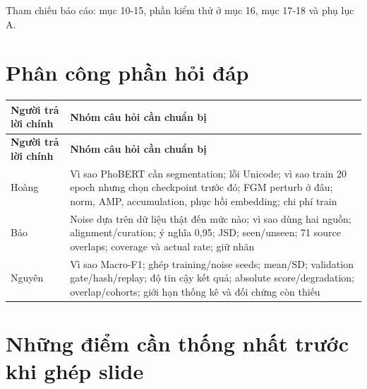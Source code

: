 \documentclass[11pt,a4paper]{article}
\newlength{\reporttablewidth}
\begin{document}
Tham chiếu báo cáo: mục 10-15, phần kiểm thử ở mục 16, mục 17-18 và phụ lục A.


\FloatBarrier\section{Phân công phần hỏi đáp}

\begingroup
\small
\setlength{\tabcolsep}{4pt}
\setlength{\reporttablewidth}{\dimexpr\linewidth-2\tabcolsep\relax}
\renewcommand{\arraystretch}{1.15}
\begin{longtable}{@{}>{\raggedright\arraybackslash}p{0.31000\reporttablewidth}>{\raggedright\arraybackslash}p{0.69000\reporttablewidth}@{}}
\toprule
\textbf{Người trả lời chính} & \textbf{Nhóm câu hỏi cần chuẩn bị} \\
\midrule
\endfirsthead
\toprule
\textbf{Người trả lời chính} & \textbf{Nhóm câu hỏi cần chuẩn bị} \\
\midrule
\endhead
\bottomrule
\endlastfoot
Hoàng & Vì sao PhoBERT cần segmentation; lỗi Unicode; vì sao train 20 epoch nhưng chọn checkpoint trước đó; FGM perturb ở đâu; norm, AMP, accumulation, phục hồi embedding; chi phí train \\
Bảo & Noise dựa trên dữ liệu thật đến mức nào; vì sao dùng hai nguồn; alignment/curation; ý nghĩa 0,95; JSD; seen/unseen; 71 source overlaps; coverage và actual rate; giữ nhãn \\
Nguyên & Vì sao Macro-F1; ghép training/noise seeds; mean/SD; validation gate/hash/replay; độ tin cậy kết quả; absolute score/degradation; overlap/cohorts; giới hạn thống kê và đối chứng còn thiếu \\
\end{longtable}
\endgroup

\FloatBarrier\section{Những điểm cần thống nhất trước khi ghép slide}
\end{document}
